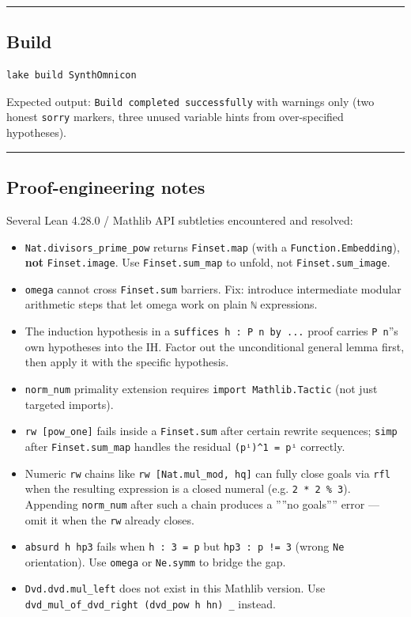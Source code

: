 \documentclass[10pt,a4paper]{article}
\begin{document}
\begin{center}
\rule{0.5\textwidth}{0.4pt}
\end{center}

\subsection{Build}

\begin{lstlisting}[language=bash]
lake build SynthOmnicon
\end{lstlisting}

Expected output: \texttt{Build completed successfully} with warnings only (two honest \texttt{sorry} markers,
three unused variable hints from over-specified hypotheses).

\begin{center}
\rule{0.5\textwidth}{0.4pt}
\end{center}

\subsection{Proof-engineering notes}

Several Lean 4.28.0 / Mathlib API subtleties encountered and resolved:

\begin{itemize}
    \item \texttt{Nat.divisors\_prime\_pow} returns \texttt{Finset.map} (with a \texttt{Function.Embedding}), \textbf{not}
\texttt{Finset.image}. Use \texttt{Finset.sum\_map} to unfold, not \texttt{Finset.sum\_image}.
    \item \texttt{omega} cannot cross \texttt{Finset.sum} barriers. Fix: introduce intermediate modular arithmetic
steps that let omega work on plain \texttt{ℕ} expressions.
    \item The induction hypothesis in a \texttt{suffices h : P n by ...} proof carries \texttt{P n}''s
own hypotheses into the IH. Factor out the unconditional general lemma first, then
apply it with the specific hypothesis.
    \item \texttt{norm\_num} primality extension requires \texttt{import Mathlib.Tactic} (not just targeted imports).
    \item \texttt{rw {[}pow\_one{]}} fails inside a \texttt{Finset.sum} after certain rewrite sequences; \texttt{simp} after
\texttt{Finset.sum\_map} handles the residual \texttt{(pⁱ)\^{}1 = pⁱ} correctly.
    \item Numeric \texttt{rw} chains like \texttt{rw {[}Nat.mul\_mod, hq{]}} can fully close goals via \texttt{rfl} when
the resulting expression is a closed numeral (e.g. \texttt{2 * 2 \% 3}). Appending \texttt{norm\_num}
after such a chain produces a ''''no goals'''' error --- omit it when the \texttt{rw} already closes.
    \item \texttt{absurd h hp3} fails when \texttt{h : 3 = p} but \texttt{hp3 : p != 3} (wrong \texttt{Ne} orientation).
Use \texttt{omega} or \texttt{Ne.symm} to bridge the gap.
    \item \texttt{Dvd.dvd.mul\_left} does not exist in this Mathlib version. Use
\texttt{dvd\_mul\_of\_dvd\_right (dvd\_pow h hn) \_} instead.
\end{itemize}
\end{document}
